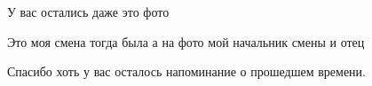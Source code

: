 
 
 
 
 


У вас остались даже это фото


Это моя смена тогда была а на фото мой начальник смены и отец


Спасибо хоть у вас осталось напоминание о прошедшем времени.

